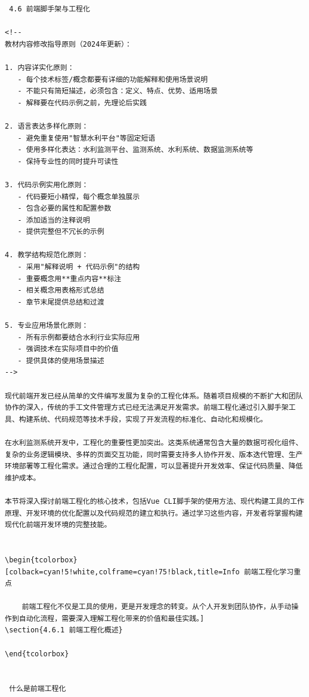 {{\begin{lstlisting}
 4.6 前端脚手架与工程化

<!--
教材内容修改指导原则（2024年更新）：

1. 内容详实化原则：
   - 每个技术标签/概念都要有详细的功能解释和使用场景说明
   - 不能只有简短描述，必须包含：定义、特点、优势、适用场景
   - 解释要在代码示例之前，先理论后实践

2. 语言表达多样化原则：
   - 避免重复使用"智慧水利平台"等固定短语
   - 使用多样化表达：水利监测平台、监测系统、水利系统、数据监测系统等
   - 保持专业性的同时提升可读性

3. 代码示例实用化原则：
   - 代码要短小精悍，每个概念单独展示
   - 包含必要的属性和配置参数
   - 添加适当的注释说明
   - 提供完整但不冗长的示例

4. 教学结构规范化原则：
   - 采用"解释说明 + 代码示例"的结构
   - 重要概念用**重点内容**标注
   - 相关概念用表格形式总结
   - 章节末尾提供总结和过渡

5. 专业应用场景化原则：
   - 所有示例都要结合水利行业实际应用
   - 强调技术在实际项目中的价值
   - 提供具体的使用场景描述
-->

现代前端开发已经从简单的文件编写发展为复杂的工程化体系。随着项目规模的不断扩大和团队协作的深入，传统的手工文件管理方式已经无法满足开发需求。前端工程化通过引入脚手架工具、构建系统、代码规范等技术手段，实现了开发流程的标准化、自动化和规模化。

在水利监测系统开发中，工程化的重要性更加突出。这类系统通常包含大量的数据可视化组件、复杂的业务逻辑模块、多样的页面交互功能，同时需要支持多人协作开发、版本迭代管理、生产环境部署等工程化需求。通过合理的工程化配置，可以显著提升开发效率、保证代码质量、降低维护成本。

本节将深入探讨前端工程化的核心技术，包括Vue CLI脚手架的使用方法、现代构建工具的工作原理、开发环境的优化配置以及代码规范的建立和执行。通过学习这些内容，开发者将掌握构建现代化前端开发环境的完整技能。


\begin{tcolorbox}[colback=cyan!5!white,colframe=cyan!75!black,title=Info 前端工程化学习重点
    
    前端工程化不仅是工具的使用，更是开发理念的转变。从个人开发到团队协作，从手动操作到自动化流程，需要深入理解工程化带来的价值和最佳实践。]
\section{4.6.1 前端工程化概述}

\end{tcolorbox}


 什么是前端工程化


\end{lstlisting}}}

